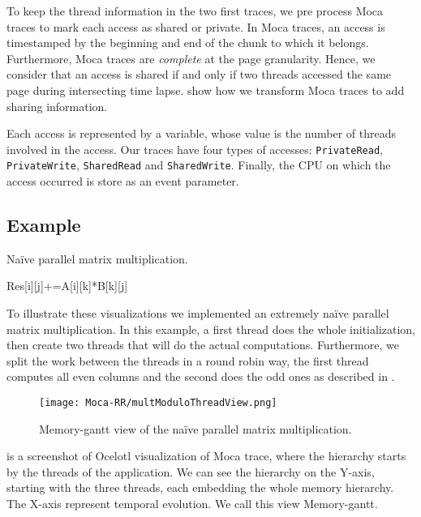To keep the thread information in the two first traces, we pre process \gls{Moca} traces to mark each access as shared or private.
In \gls{Moca} traces, an access is timestamped by the beginning and end of the chunk to which it belongs.
Furthermore, \gls{Moca} traces are \emph{complete} at the page granularity.
Hence, we consider that an access is shared if and only if two threads accessed the same page during intersecting time lapse.
 show how we transform \gls{Moca} traces to add sharing information.

Each access is represented by a variable, whose value is the number of threads involved in the access.
Our traces have four types of accesses: \texttt{PrivateRead}, \texttt{PrivateWrite}, \texttt{SharedRead} and \texttt{SharedWrite}.
Finally, the \gls{CPU} on which the access occurred is store as an event parameter.

\subsection{Example}

\begin{algorithm}
    \caption{Naïve parallel matrix multiplication.}
    \label{alg:mat-par}
    \begin{algorithmic}
                    \State Res[i][j]+=A[i][k]*B[k][j]
                \EndFor
            \EndFor
        \EndFor
    \end{algorithmic}
\end{algorithm}

To illustrate these visualizations we implemented an extremely naïve parallel matrix multiplication.
In this example, a first thread does the whole initialization, then create two threads that will do the actual computations.
Furthermore, we split the work between the threads in a round robin way, the first thread computes all even columns and the second does the odd ones as described in .

\begin{figure}[htb]
    \centering
    \texttt{[image: Moca-RR/multModuloThreadView.png]}
    \caption{Memory-gantt view of the naïve parallel matrix multiplication.}
    \label{fig:ocelotl-th0}
\end{figure}

 is a screenshot of \gls{Ocelotl} visualization of \gls{Moca} trace, where the hierarchy starts by the threads of the application.
We can see the hierarchy on the Y-axis, starting with the three threads, each embedding the whole memory hierarchy.
The X-axis represent temporal evolution.
We call this view Memory-gantt.

